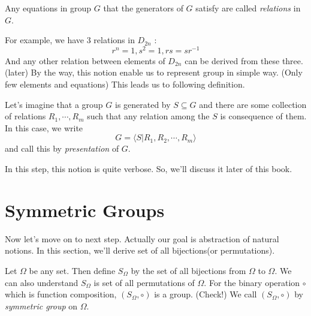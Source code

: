 \documentclass[12pt, a4paper, openany, twoside]{book}
\theoremstyle{definition}
\theoremstyle{remark}
\theoremstyle{plain}
\numberwithin{equation}{section}
\begin{document}
\begin{tcolorbox}[colback=yellow!10!white,colframe=brown!75!black,title=Relation in $G$]

Any equations in group $G$ that the generators of $G$ satisfy are called \textit{relations} in $G$.

\end{tcolorbox}

For example, we have 3 relations in $D_{2n}$ : 
\[r^n = 1, s^2 = 1, rs = sr^{-1}\]
And any other relation between elements of $D_{2n}$ can be derived from these three. (later)
By the way, this notion enable us to represent group in simple way. (Only few elements and equations)
This leads us to following definition. 

\begin{tcolorbox}[colback=yellow!10!white,colframe=brown!75!black,title=Presentation of $G$]

Let's imagine that a group $G$ is generated by $S \subseteq G$ and there are some collection of relations $R_1, \cdots, R_m$ such that 
any relation among the $S$ is consequence of them. In this case, we write 
\[G = \langle S | R_1, R_2, \cdots, R_m \rangle\]
and call this by \textit{presentation} of $G$. 

\end{tcolorbox}

In this step, this notion is quite verbose. So, we'll discuss it later of this book. 

\newpage 

\section{Symmetric Groups}

Now let's move on to next step. Actually our goal is abstraction of natural notions. In this section, we'll 
derive set of all bijections(or permutations). 

\begin{tcolorbox}[colback=yellow!10!white,colframe=brown!75!black,title=Symmetric Group on $\Omega$]

Let $\Omega$ be any set. Then define $S_\Omega$ by the set of all bijections from $\Omega$ to $\Omega$. 
We can also understand $S_\Omega$ is set of all permutations of $\Omega$. For the binary operation $\circ$ which is function composition, 
$(S_\Omega, \circ)$ is a group. (Check!) We call $(S_\Omega, \circ)$ by \textit{symmetric group} on $\Omega$. 

\end{tcolorbox}
\end{document}
